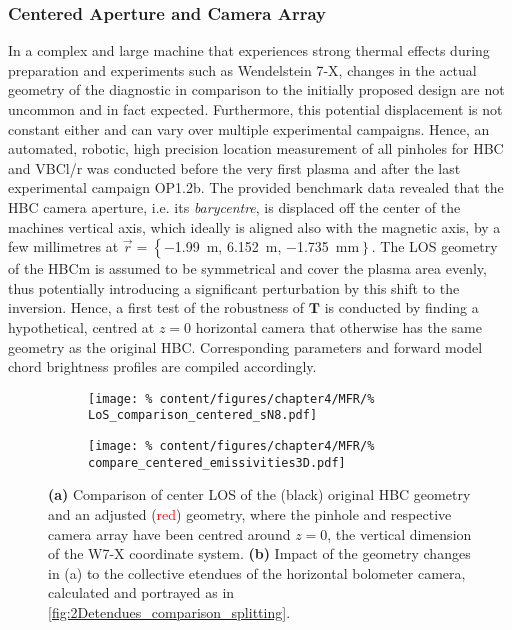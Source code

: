         \subsubsection*{Centered Aperture and Camera Array}%
%
            In a complex and large machine that experiences strong thermal effects during preparation and experiments such as Wendelstein 7-X, changes in the actual geometry of the diagnostic in comparison to the initially proposed design are not uncommon and in fact expected. Furthermore, this potential displacement is not constant either and can vary over multiple experimental campaigns. Hence, an automated, robotic, high precision location measurement of all pinholes for HBC and VBCl/r was conducted before the very first plasma and after the last experimental campaign OP1.2b. The provided benchmark data revealed that the HBC camera aperture, i.e. its \textit{barycentre}, is displaced off the center of the machines vertical axis, which ideally is aligned also with the magnetic axis, by a few millimetres at $\vec{r}=\left\{\right.$\SI{-1.99}{\meter}, \SI{6.152}{\meter}, \SI{-1.735}{\milli\meter}$\left.\right\}$. The LOS geometry of the HBCm is assumed to be symmetrical and cover the plasma area evenly, thus potentially introducing a significant perturbation by this shift to the inversion. Hence, a first test of the robustness of $\mathbf{T}$ is conducted by finding a hypothetical, centred at $z=0$ horizontal camera that otherwise has the same geometry as the original HBC. Corresponding parameters and forward model chord brightness profiles are compiled accordingly.\\%
%
            \begin{figure}[t]%
                \centering%
                \begin{subfigure}{0.4\textwidth}%
                    \texttt{[image: \%
                        content/figures/chapter4/MFR/\%
                        LoS\_comparison\_centered\_sN8.pdf]}%
                    \caption{}%
                \end{subfigure}%
                \hfill%
                \begin{subfigure}{0.55\textwidth}%
                    \texttt{[image: \%
                        content/figures/chapter4/MFR/\%
                        compare\_centered\_emissivities3D.pdf]}%
                    \caption{}%
                \end{subfigure}%
                \caption{\textbf{(a)} Comparison of center LOS of the (black) original HBC geometry and an adjusted (\textcolor{red}{red}) geometry, where the pinhole and respective camera array have been centred around $z=0$, the vertical dimension of the W7-X coordinate system. \textbf{(b)} Impact of the geometry changes in (a) to the collective etendues of the horizontal bolometer camera, calculated and portrayed as in \cref{fig:2Detendues_comparison_splitting}.}\label{fig:geometry_change_centered}%
            \end{figure}%
